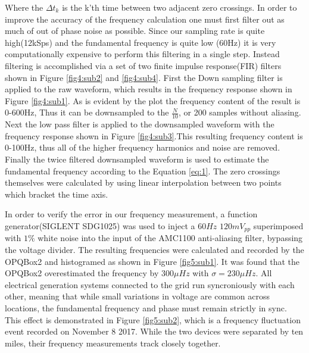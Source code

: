 Where the $\Delta t_{k}$ is the k'th time between two adjacent zero crossings. In order to improve the accuracy of the frequency calculation one must first filter out as much of out of phase noise as possible. Since our sampling rate is quite high(12kSps) and the fundamental frequency is quite low (60Hz) it is very computationally expensive to perform this filtering in a single step. Instead filtering is accomplished via a set of two finite impulse response(FIR) filters shown in Figure \ref{fig4:sub2} and \ref{fig4:sub4}. First the Down sampling filter is applied to the raw waveform, which results in the frequency response shown in Figure \ref{fig4:sub1}. As is evident by the plot the frequency content of the result is 0-600Hz, Thus it can be downsampled to the $\frac{N}{10}$, or 200 samples without aliasing. Next the low pass filter is applied to the downsampled waveform with the frequency response shown in Figure \ref{fig4:sub3}.This resulting frequency content is 0-100Hz, thus all of the higher frequency harmonics and noise are removed. Finally the twice filtered downsampled waveform is used to estimate the fundamental frequency according to the Equation \ref{eq:1}. The zero crossings themselves were calculated by using linear interpolation between two points which bracket the time axis.

In order to verify the error in our frequency measurement, a function generator(SIGLENT SDG1025) was used to inject a $60Hz$ $120mV_{pp}$ superimposed with $1\%$ white noise into the input of the AMC1100 anti-aliasing filter, bypassing the voltage divider. The resulting frequencies were calculated and recorded by the OPQBox2 and histogramed as shown in Figure \ref{fig5:sub1}. It was found that the OPQBox2 overestimated the frequency by $300\mu Hz$ with $\sigma  = 230\mu Hz$. All electrical generation systems connected to the grid run syncroniously with each other, meaning that while small variations in voltage are common across locations, the fundamental frequency and phase must remain strictly in sync. This effect is demonstrated in Figure \ref{fig5:sub2}, which is a frequency fluctuation event recorded on November 8 2017. While the two devices were separated by ten miles, their frequency measurements track closely together.

